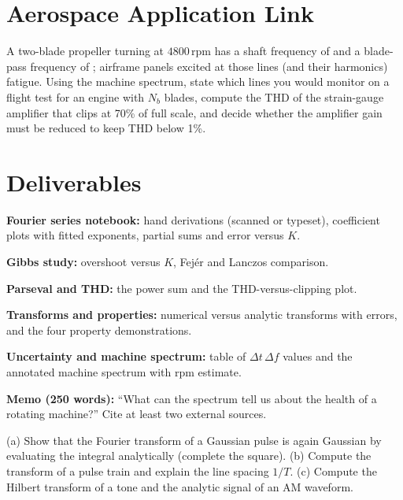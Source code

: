 \documentclass[11pt,a4paper]{article}
\begin{document}
\section*{Aerospace Application Link}
A two-blade propeller turning at $4800\,\mathrm{rpm}$ has a shaft frequency of  and a blade-pass frequency of ; airframe panels excited at those lines (and their harmonics) fatigue. Using the machine spectrum, state which lines you would monitor on a flight test for an engine with $N_b$ blades, compute the THD of the strain-gauge amplifier that clips at 70\% of full scale, and decide whether the amplifier gain must be reduced to keep THD below 1\%.

\section*{Deliverables}
\begin{delivs}
  \item[D1] \textbf{Fourier series notebook:} hand derivations (scanned or typeset), coefficient plots with fitted exponents, partial sums and error versus $K$.
  \item[D2] \textbf{Gibbs study:} overshoot versus $K$, Fej\'er and Lanczos comparison.
  \item[D3] \textbf{Parseval and THD:} the power sum and the THD-versus-clipping plot.
  \item[D4] \textbf{Transforms and properties:} numerical versus analytic transforms with errors, and the four property demonstrations.
  \item[D5] \textbf{Uncertainty and machine spectrum:} table of $\Delta t\,\Delta f$ values and the annotated machine spectrum with rpm estimate.
  \item[D6] \textbf{Memo (250 words):} ``What can the spectrum tell us about the health of a rotating machine?'' Cite at least two external sources.
  \item[Bonus] (a) Show that the Fourier transform of a Gaussian pulse is again Gaussian by evaluating the integral analytically (complete the square). (b) Compute the transform of a pulse train and explain the line spacing $1/T$. (c) Compute the Hilbert transform of a tone and the analytic signal of an AM waveform.
\end{delivs}
\end{document}
